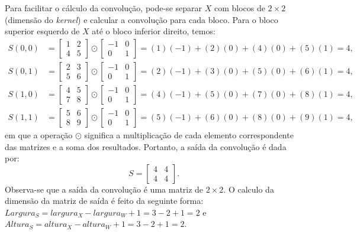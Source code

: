 \begin{exemplo}
Para facilitar o cálculo da convolução, pode-se separar $X$ com blocos de $2\times2$ (dimensão do \textit{kernel}) e calcular a convolução para cada bloco. Para o bloco superior esquerdo de $X$ até o bloco inferior direito, temos:
\begin{align*}
    S(0,0) &= \begin{bmatrix}
            1 & 2 \\
            4 & 5 
        \end{bmatrix} \odot \begin{bmatrix}-1 & 0 \\
            0 & 1 
        \end{bmatrix} = (1)(-1) + (2)(0) + (4)(0) + (5)(1) = 4, \\
    S(0,1) &= \begin{bmatrix}
            2 & 3 \\
            5 & 6 
        \end{bmatrix} \odot \begin{bmatrix}-1 & 0 \\
            0 & 1 
        \end{bmatrix} = (2)(-1) + (3)(0) + (5)(0) + (6)(1) = 4, \\
    S(1,0) &= \begin{bmatrix}
            4 & 5 \\
            7 & 8 
        \end{bmatrix} \odot \begin{bmatrix}-1 & 0 \\
            0 & 1 
        \end{bmatrix} = (4)(-1) + (5)(0) + (7)(0) + (8)(1) = 4, \\
    S(1,1) &= \begin{bmatrix}
            5 & 6 \\
            8 & 9 
        \end{bmatrix} \odot \begin{bmatrix}-1 & 0 \\
            0 & 1 
        \end{bmatrix} = (5)(-1) + (6)(0) + (8)(0) + (9)(1) = 4,
\end{align*}
em que a operação $\odot$ significa a multiplicação de cada elemento correspondente das matrizes e a soma dos resultados. Portanto, a saída da convolução é dada por:
\begin{equation}
    S = \begin{bmatrix}4 & 4 \\
            4 & 4 
        \end{bmatrix}.
\end{equation}
Observa-se que a saída da convolução é uma matriz de $2\times2$. O calculo da dimensão da matriz de saída é  feito da seguinte forma: $Largura_{S} = largura_{X} - largura_{W} + 1 = 3 - 2 + 1 = 2$ e $Altura_{S} = altura_{X} - altura_{W}  + 1 = 3 - 2 + 1 = 2$.

\end{exemplo}


